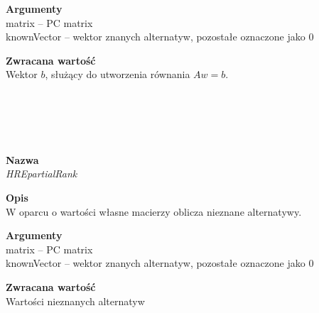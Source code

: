 \begin{spacing}{1.0}
\begin{spacing}{1.2}
\textbf{Argumenty} \\
matrix -- PC matrix \\
knownVector -- wektor znanych alternatyw, pozostałe oznaczone jako $0$ \\ \begin{spacing}{0.3}  \end{spacing}

\textbf{Zwracana wartość}\\ Wektor $b$, służący do utworzenia równania $Aw = b$. \\ \begin{spacing}{0.3}  \end{spacing}


\\~\\ 
\begin{spacing}{1.2}
 \\ \begin{spacing}{0.5}  \end{spacing}

\textbf{Nazwa}\\  \emph{HREpartialRank} \\ \begin{spacing}{0.3}  \end{spacing}
 
\textbf{Opis}\\ W oparcu o wartości własne macierzy oblicza nieznane alternatywy. \\  \begin{spacing}{0.3}  \end{spacing}
 
\textbf{Argumenty} \\
matrix -- PC matrix \\
knownVector -- wektor znanych alternatyw, pozostałe oznaczone jako $0$ \\ \begin{spacing}{0.3}  \end{spacing}

\textbf{Zwracana wartość}\\ Wartości nieznanych alternatyw  \\ \begin{spacing}{0.3}  \end{spacing}


\\~\\ 
\begin{spacing}{1.2}
 \\ \begin{spacing}{0.5}  \end{spacing}


\end{spacing}
\end{spacing}
\end{spacing}
\end{spacing}
